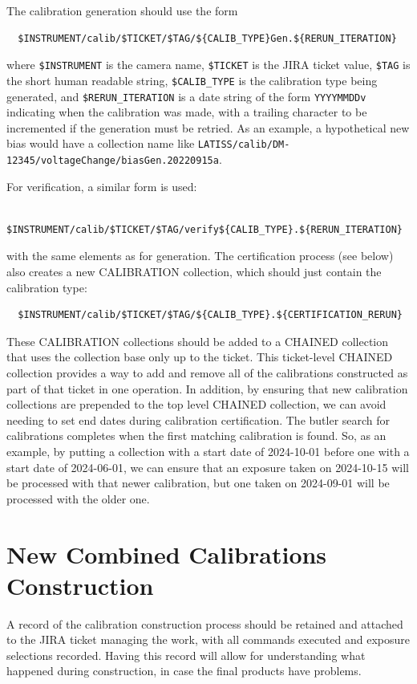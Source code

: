 \documentclass[DM,authoryear,toc]{lsstdoc}
\begin{document}
The calibration generation should use the form
\begin{verbatim}
  $INSTRUMENT/calib/$TICKET/$TAG/${CALIB_TYPE}Gen.${RERUN_ITERATION}
\end{verbatim}
where \verb|$INSTRUMENT| is the camera name, \verb|$TICKET| is the JIRA ticket value, \verb|$TAG| is the short human readable string, \verb|$CALIB_TYPE| is the calibration type being generated, and \verb|$RERUN_ITERATION| is a date string of the form \verb|YYYYMMDDv| indicating when the calibration was made, with a trailing character to be incremented if the generation must be retried.
As an example, a hypothetical new bias would have a collection name like \verb|LATISS/calib/DM-12345/voltageChange/biasGen.20220915a|.

For verification, a similar form is used:
\begin{verbatim}
  $INSTRUMENT/calib/$TICKET/$TAG/verify${CALIB_TYPE}.${RERUN_ITERATION}
\end{verbatim}
with the same elements as for generation.
The certification process (see below) also creates a new CALIBRATION collection, which should just contain the calibration type:
\begin{verbatim}
  $INSTRUMENT/calib/$TICKET/$TAG/${CALIB_TYPE}.${CERTIFICATION_RERUN}
\end{verbatim}
These CALIBRATION collections should be added to a CHAINED collection that uses the collection base only up to the ticket.
This ticket-level CHAINED collection provides a way to add and remove all of the calibrations constructed as part of that ticket in one operation.
In addition, by ensuring that new calibration collections are prepended to the top level CHAINED collection, we can avoid needing to set end dates during calibration certification.
The butler search for calibrations completes when the first matching calibration is found.
So, as an example, by putting a collection with a start date of 2024-10-01 before one with a start date of 2024-06-01, we can ensure that an exposure taken on 2024-10-15 will be processed with that newer calibration, but one taken on 2024-09-01 will be processed with the older one.

\section{New Combined Calibrations Construction}

A record of the calibration construction process should be retained and attached to the JIRA ticket managing the work, with all commands executed and exposure selections recorded.
Having this record will allow for understanding what happened during construction, in case the final products have problems.
\end{document}
